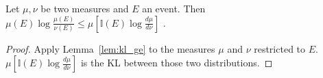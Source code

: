 \begin{lemma}
  \label{lem:expectation_llr_event}
  Let $\mu, \nu$ be two measures and $E$ an event. Then
  $\mu(E)\log\frac{\mu(E)}{\nu(E)} \le \mu\left[\mathbb{I}(E)\log \frac{d \mu}{d \nu}\right]$ .
\end{lemma}

\begin{proof}
Apply Lemma~\ref{lem:kl_ge} to the measures $\mu$ and $\nu$ restricted to $E$. $\mu\left[\mathbb{I}(E)\log \frac{d \mu}{d \nu}\right]$ is the KL between those two distributions.
\end{proof}
